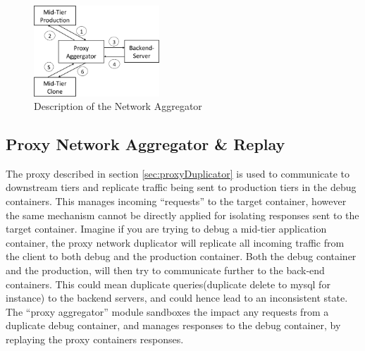 \begin{figure}[t]
  \begin{center}
    \includegraphics[width=0.42\textwidth]{figs/aggregator.png}
    \caption{Description of the Network Aggregator}
    \label{fig:aggregator}
  \end{center}
\end{figure}

\subsection{Proxy Network Aggregator \& Replay }
\label{sec:proxyAggregator}

The proxy described in section \ref{sec:proxyDuplicator} is used to communicate to downstream tiers and replicate traffic being sent to production tiers in the debug containers.
This manages incoming ``requests'' to the target container, however the same mechanism cannot be directly applied for isolating responses sent to the target container. 
Imagine if you are trying to debug a mid-tier application container, the proxy network duplicator will replicate all incoming traffic from the client to both debug and the production container. 
Both the debug container and the production, will then try to communicate further to the back-end containers.
This could mean duplicate queries(duplicate delete to mysql for instance) to the backend servers, and could hence lead to an inconsistent state.
The ``proxy aggregator'' module sandboxes the impact any requests from a duplicate debug container, and manages responses to the debug container, by replaying the proxy containers responses.

